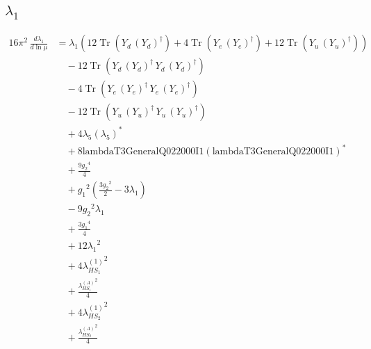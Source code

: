 \documentclass[10pt,a4paper]{article}
\begin{document}
\subsection*{$\lambda_1$}
\begin{align*}
16\pi^2\,\frac{d \lambda_1}{d\ln\mu} &={\lambda_1} (12 \operatorname{Tr}\!\left({Y_d}\,\left({Y_d}\right)^{\dagger}\right)+4 \operatorname{Tr}\!\left({Y_e}\,\left({Y_e}\right)^{\dagger}\right)+12 \operatorname{Tr}\!\left({Y_u}\,\left({Y_u}\right)^{\dagger}\right)) \\
&\quad -12 \operatorname{Tr}\!\left({Y_d}\,\left({Y_d}\right)^{\dagger}\,{Y_d}\,\left({Y_d}\right)^{\dagger}\right) \\
&\quad -4 \operatorname{Tr}\!\left({Y_e}\,\left({Y_e}\right)^{\dagger}\,{Y_e}\,\left({Y_e}\right)^{\dagger}\right) \\
&\quad -12 \operatorname{Tr}\!\left({Y_u}\,\left({Y_u}\right)^{\dagger}\,{Y_u}\,\left({Y_u}\right)^{\dagger}\right) \\
&\quad +4 {\lambda_5} \left({\lambda_5}\right)^{*} \\
&\quad +8 \text{lambdaT3GeneralQ022000I1} \left(\text{lambdaT3GeneralQ022000I1}\right)^{*} \\
&\quad +\frac{9 {g_2}^4}{4} \\
&\quad +{g_1}^2 \left(\frac{3 {g_2}^2}{2}-3 {\lambda_1}\right) \\
&\quad -9 {g_2}^2 {\lambda_1} \\
&\quad +\frac{3 {g_1}^4}{4} \\
&\quad +12 {\lambda_1}^2 \\
&\quad +4 {\lambda_{HS_1}^{(1)}}^2 \\
&\quad +\frac{{\lambda_{HS_1}^{(A)}}^2}{4} \\
&\quad +4 {\lambda_{HS_2}^{(1)}}^2 \\
&\quad +\frac{{\lambda_{HS_2}^{(A)}}^2}{4} \\
\end{align*}
\end{document}
